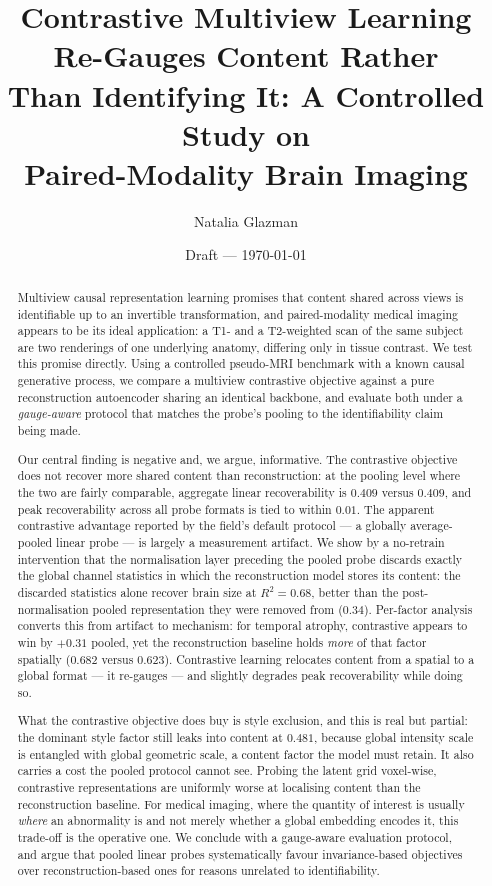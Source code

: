 \documentclass[11pt]{article}
\title{\textbf{Contrastive Multiview Learning Re-Gauges Content Rather\\Than Identifying It: A Controlled Study on\\Paired-Modality Brain Imaging}}
\author{Natalia Glazman \\ \todo{affiliation, co-authors, supervisor}}
\date{Draft --- \today}
\begin{document}
\maketitle

\begin{abstract}
Multiview causal representation learning promises that content shared across
views is identifiable up to an invertible transformation, and paired-modality
medical imaging appears to be its ideal application: a T1- and a T2-weighted
scan of the same subject are two renderings of one underlying anatomy, differing
only in tissue contrast. We test this promise directly. Using a controlled
pseudo-MRI benchmark with a known causal generative process, we compare a
multiview contrastive objective against a pure reconstruction autoencoder
sharing an identical backbone, and evaluate both under a \emph{gauge-aware}
protocol that matches the probe's pooling to the identifiability claim being
made.

Our central finding is negative and, we argue, informative. The contrastive
objective does not recover more shared content than reconstruction: at the
pooling level where the two are fairly comparable, aggregate linear
recoverability is $0.409$ versus $0.409$, and peak recoverability across all
probe formats is tied to within $0.01$. The apparent contrastive advantage
reported by the field's default protocol --- a globally average-pooled linear
probe --- is largely a measurement artifact. We show by a no-retrain
intervention that the normalisation layer preceding the pooled probe discards
exactly the global channel statistics in which the reconstruction model stores
its content: the discarded statistics alone recover brain size at $R^2=0.68$,
better than the post-normalisation pooled representation they were removed from
($0.34$). Per-factor analysis converts this from artifact to mechanism: for
temporal atrophy, contrastive appears to win by $+0.31$ pooled, yet the
reconstruction baseline holds \emph{more} of that factor spatially ($0.682$
versus $0.623$). Contrastive learning relocates content from a spatial to a
global format --- it re-gauges --- and slightly degrades peak recoverability
while doing so.

What the contrastive objective does buy is style exclusion, and this is real but
partial: the dominant style factor still leaks into content at $0.481$, because
global intensity scale is entangled with global geometric scale, a content
factor the model must retain. It also carries a cost the pooled protocol cannot
see. Probing the latent grid voxel-wise, contrastive representations are
uniformly worse at localising content than the reconstruction baseline. For
medical imaging, where the quantity of interest is usually \emph{where} an
abnormality is and not merely whether a global embedding encodes it, this
trade-off is the operative one. We conclude with a gauge-aware evaluation
protocol, and argue that pooled linear probes systematically favour
invariance-based objectives over reconstruction-based ones for reasons unrelated
to identifiability.
\end{abstract}
\end{document}
